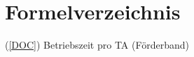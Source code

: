 \chapter{Formelverzeichnis}
\label{ch:Formelverzeichnis}
(\ref{DOC}) Betriebszeit pro TA (Förderband) \\
